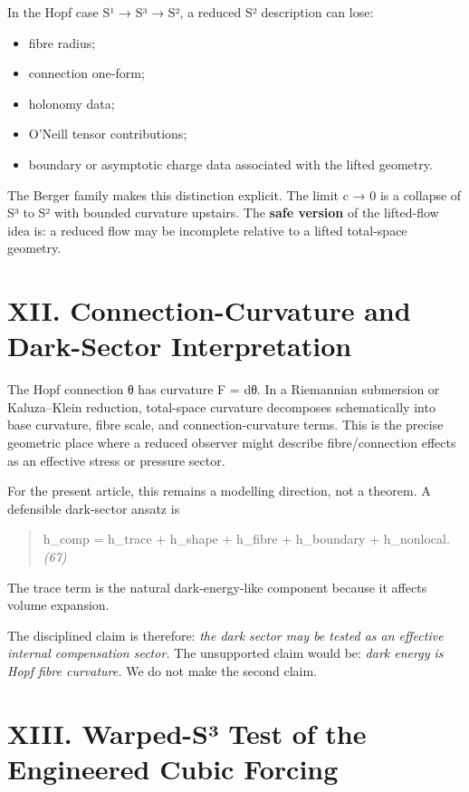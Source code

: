 \documentclass[
]{article}
\begin{document}
In the Hopf case S¹ → S³ → S², a reduced S² description can lose:

\begin{itemize}
\item
  fibre radius;
\item
  connection one-form;
\item
  holonomy data;
\item
  O'Neill tensor contributions;
\item
  boundary or asymptotic charge data associated with the lifted geometry.
\end{itemize}

The Berger family makes this distinction explicit. The limit c → 0 is a collapse of S³ to S² with bounded curvature upstairs. The \textbf{safe version} of the lifted-flow idea is: a reduced flow may be incomplete relative to a lifted total-space geometry.

\section{XII. Connection-Curvature and Dark-Sector Interpretation}\label{xii.-connection-curvature-and-dark-sector-interpretation}

The Hopf connection θ has curvature F = dθ. In a Riemannian submersion or Kaluza--Klein reduction, total-space curvature decomposes schematically into base curvature, fibre scale, and connection-curvature terms. This is the precise geometric place where a reduced observer might describe fibre/connection effects as an effective stress or pressure sector.

For the present article, this remains a modelling direction, not a theorem. A defensible dark-sector ansatz is

\begin{quote}
h\_comp = h\_trace + h\_shape + h\_fibre + h\_boundary + h\_nonlocal. \emph{(67)}
\end{quote}

The trace term is the natural dark-energy-like component because it affects volume expansion.

The disciplined claim is therefore: \emph{the dark sector may be tested as an effective internal compensation sector.} The unsupported claim would be: \emph{dark energy is Hopf fibre curvature.} We do not make the second claim.

\section{XIII. Warped-S³ Test of the Engineered Cubic Forcing}\label{xiii.-warped-suxb3-test-of-the-engineered-cubic-forcing}
\end{document}
